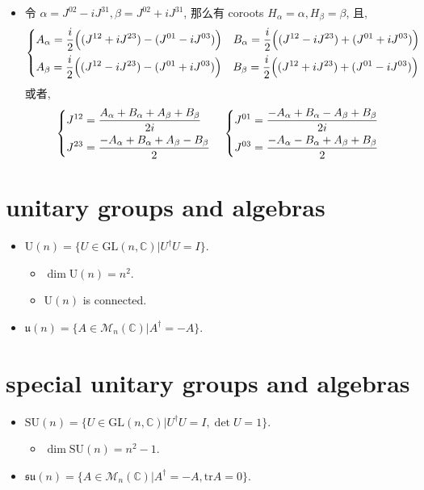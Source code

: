 \begin{itemize}
	\item 令 $\alpha = J^{0 2} - i J^{3 1}, \beta = J^{0 2} + i J^{3 1}$, 那么有 coroots $H_\alpha = \alpha, H_\beta = \beta$, 且,
	\begin{equation}
		\begin{dcases}
			A_\alpha = \frac{i}{2} \Big( (J^{1 2} + i J^{2 3}) - (J^{0 1} - i J^{0 3}) \Big) \quad B_\alpha = \frac{i}{2} \Big( (J^{1 2} - i J^{2 3}) + (J^{0 1} + i J^{0 3}) \Big) \\
			A_\beta = \frac{i}{2} \Big( (J^{1 2} - i J^{2 3}) - (J^{0 1} + i J^{0 3}) \Big) \quad B_\beta = \frac{i}{2} \Big( (J^{1 2} + i J^{2 3}) + (J^{0 1} - i J^{0 3}) \Big)
		\end{dcases}
	\end{equation}
	或者,
	\begin{equation}
		\begin{dcases}
			J^{1 2} = \frac{A_\alpha + B_\alpha + A_\beta + B_\beta}{2 i} \\
			J^{2 3} = \frac{- A_\alpha + B_\alpha + A_\beta - B_\beta}{2}
		\end{dcases} \quad \begin{dcases}
			J^{0 1} = \frac{- A_\alpha + B_\alpha - A_\beta + B_\beta}{2 i} \\
			J^{0 3} = \frac{- A_\alpha - B_\alpha + A_\beta + B_\beta}{2}
		\end{dcases}
	\end{equation}
\end{itemize}

\section{unitary groups and algebras}
\begin{itemize}
	\item $\mathrm{U}(n) = \{U \in \mathrm{GL}(n, \mathbb{C}) | U^\dag U = I\}$.
	\begin{itemize}
		\item $\dim \mathrm{U}(n) = n^2$.
		
		\item $\mathrm{U}(n)$ is connected.
	\end{itemize}
	
	\item $\mathfrak{u}(n) = \{A \in \mathcal{M}_n(\mathbb{C}) | A^\dag = - A\}$.
\end{itemize}

\section{special unitary groups and algebras}
\begin{itemize}
	\item $\mathrm{SU}(n) = \{U \in \mathrm{GL}(n, \mathbb{C}) | U^\dag U = I, \det U = 1\}$.
	\begin{itemize}
		\item $\dim \mathrm{SU}(n) = n^2 - 1$.
	\end{itemize}
	
	\item $\mathfrak{su}(n) = \{A \in \mathcal{M}_n(\mathbb{C}) | A^\dag = - A, \mathrm{tr} A = 0\}$.
\end{itemize}

